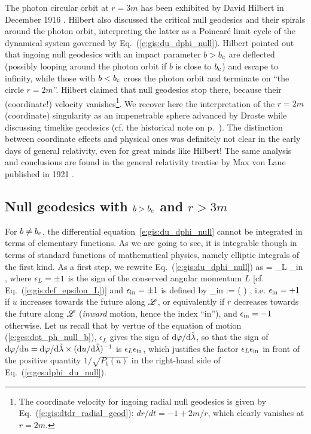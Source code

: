 \begin{hist}
The photon circular orbit at $r=3m$ has been exhibited by David Hilbert
in December 1916 \cite{Hilbe1917a,Hilbe1917b}. Hilbert also discussed the
critical null geodesics and their spirals
around the photon orbit, interpreting the latter as a Poincaré limit cycle
of the dynamical system governed by Eq.~(\ref{e:gis:du_dphi_null}).
Hilbert pointed out that ingoing null geodesics with an impact parameter
$b > b_{\rm c}$ are deflected (possibly looping
around the photon orbit if $b$ is close to $b_{\rm c}$) and escape to infinity,
while those with $b < b_{\rm c}$ cross the photon orbit and terminate on ``the circle
$r=2m$''. Hilbert claimed that null geodesics stop there, because
their (coordinate!) velocity vanishes\footnote{The coordinate velocity for
ingoing radial null geodesics is given by Eq.~(\ref{e:gis:dtdr_radial_geod}):
$dr/dt = - 1 + 2m/r$, which clearly vanishes at $r=2m$.}. We recover here the interpretation
of the $r=2m$ (coordinate) singularity as an impenetrable sphere advanced by Droste while discussing
timelike geodesics (cf. the historical note on p.~\pageref{h:ges:geod}). The distinction
between coordinate effects and physical ones was definitely not clear in the early
days of general relativity, even for great minds like Hilbert!
The same analysis and conclusions are found in the general relativity treatise
by Max von Laue published in 1921 \cite{Laue1921}.
\end{hist}

\subsection{Null geodesics with \texorpdfstring{$b > b_{\rm c}$}{b>bc} and \texorpdfstring{$r> 3m$}{r>3m}} \label{s:gis:geod_b_gt_bc_out}

For $b \not= b_{\rm c}$, the differential equation~\eqref{e:gis:du_dphi_null} cannot be integrated
in terms of elementary functions. As we are going to see, it is integrable
though in terms of standard
functions of mathematical physics, namely elliptic integrals of the first kind.
As a first step, we rewrite Eq.~(\ref{e:gis:du_dphi_null}) as
\be \label{e:ges:dphi_du_null}
    = \eps_L \eps_{\rm in}   ,
\ee
where $\epsilon_L = \pm 1$ is the sign of the conserved angular momentum $L$
[cf. Eq.~(\ref{e:gis:def_epsilon_L})] and $\epsilon_{\rm in} = \pm 1$ is
defined by
\be
    \eps_{\rm in} :=  \left(  \right) ,
\ee
i.e. $\epsilon_{\rm in} = +1$ if $u$ increases towards the future along $\mathscr{L}$, or equivalently
if $r$ decreases towards the future along $\mathscr{L}$ (\emph{inward} motion, hence the index ``in''),
and $\epsilon_{\rm in} = -1$ otherwise.
Let us recall that by vertue of the equation of motion (\ref{e:ges:dot_ph_null_b}),
$\epsilon_L$ gives the sign of $\mathrm{d}\varphi/\mathrm{d}{\tilde\lambda}$, so that the sign of
$\mathrm{d}\varphi/\mathrm{d} u = \mathrm{d}\varphi/\mathrm{d}{\tilde\lambda} \times (\mathrm{d} u/\mathrm{d}{\tilde\lambda})^{-1}$ is $\epsilon_L \epsilon_{\rm in}$,
which justifies the factor $\epsilon_L \epsilon_{\rm in}$ in front of the positive
quantity $1/\sqrt{P_b(u)}$ in the right-hand side of Eq.~(\ref{e:ges:dphi_du_null}).

